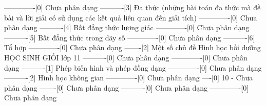 -------------[0] Chưa phân dạng
----------[3] Đa thức (những bài toán đa thức mà đề bài và lời giải có sử dụng các kết quả liên quan đến giải tích)
-------------[0] Chưa phân dạng
----------[4] Bất đẳng thức lượng giác
-------------[0] Chưa phân dạng
----------[5] Bất đẳng thức trong dãy số
-------------[0] Chưa phân dạng
----------[6] Tổ hợp
-------------[0] Chưa phân dạng
-------[2] Một số chủ đề Hình học bồi dưỡng HỌC SINH GIỎI lớp 11
----------[0] Chưa phân dạng
-------------[0] Chưa phân dạng
----------[1] Phép biến hình và phép đồng dạng
-------------[0] Chưa phân dạng
----------[2] Hình học không gian
-------------[0] Chưa phân dạng
----[0] 10 - Chưa phân dạng
-------[0] Chưa phân dạng
----------[0] Chưa phân dạng
-------------[0] Chưa phân dạng

